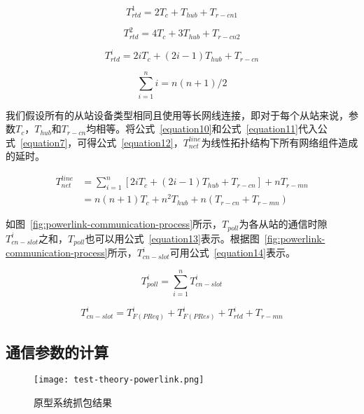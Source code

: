 \begin{equation}
\label{equation8}
T_{rtd}^{1}=2T_{c}+T_{hub}+T_{r-cn1}
\end{equation}

\begin{equation}
\label{equation9}
T_{rtd}^{2}=4T_{c}+3T_{hub}+T_{r-cn2}
\end{equation}

\begin{equation}
\label{equation10}
T_{rtd}^{i}=2iT_{c}+(2i-1)T_{hub}+T_{r-cn}
\end{equation}

\begin{equation}
\label{equation11}
\sum_{i=1}^ni=n(n+1)/2
\end{equation}

我们假设所有的从站设备类型相同且使用等长网线连接，即对于每个从站来说，参数$T_{c}$，$T_{hub}$和$T_{r-cn}$均相等。将公式~\ref{equation10}和公式~\ref{equation11}代入公式~\ref{equation7}，可得公式~\ref{equation12}，$T_{net}^{line}$为线性拓扑结构下所有网络组件造成的延时。

\begin{equation}
\begin{split}
\label{equation12}
T_{net}^{line}&=\sum_{i=1}^n[2iT_{c}+(2i-1)T_{hub}+T_{r-cn}]+nT_{r-mn}\\
&=n(n+1)T_{c}+n^2T_{hub}+n(T_{r-cn}+T_{r-mn})
\end{split}
\end{equation}

如图~\ref{fig:powerlink-communication-process}所示，$T_{poll}$为各从站的通信时隙$T_{cn-slot}^{i}$之和，$T_{poll}$也可以用公式~\ref{equation13}表示。根据图~\ref{fig:powerlink-communication-process}所示，$T_{cn-slot}^{i}$可用公式~\ref{equation14}表示。

\begin{equation}
\label{equation13}
T_{poll}^{i}=\sum_{i=1}^nT_{cn-slot}^{i}
\end{equation}

\begin{equation}
\label{equation14}
T_{cn-slot}^{i}=T_{F(PReq)}^{i}+T_{F(PRes)}^{i}+T_{rtd}^{i}+T_{r-mn}
\end{equation}

\subsection{通信参数的计算}

\begin{figure}[!htb]
  \centering
  \texttt{[image: test-theory-powerlink.png]}
  \caption{原型系统抓包结果}
  \label{fig:test-theory-powerlink}
\end{figure}

